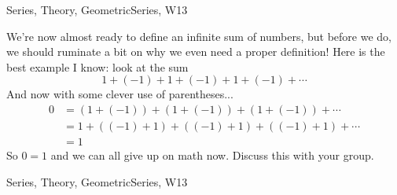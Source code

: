 \begin{tagblock}{Series, Theory, GeometricSeries, W13}
\begin{question}

We're now almost ready to define an infinite sum of numbers, but before we do, we should ruminate a bit on why we even need a proper definition! Here is the best example I know: look at the sum
\[
1+(-1)+1+(-1)+1+(-1)+\cdots
\]
And now with some clever use of parentheses...
\begin{align*}
0&=(1+(-1))+(1+(-1))+(1+(-1))+\cdots\\
&=1+((-1)+1)+((-1)+1)+((-1)+1)+\cdots\\
&=1
\end{align*}
So $0=1$ and we can all give up on math now. Discuss this with your group.
	
	
\begin{tags}
	    Series, Theory, GeometricSeries, W13
\end{tags}
	
\begin{diary}
	    
\end{diary}
	
\begin{solution}
	   
\end{solution}
	
\end{question}

\end{tagblock}



